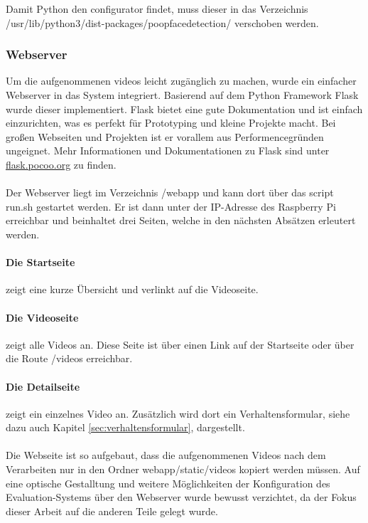 Damit Python den configurator findet, muss dieser in das Verzeichnis /usr/lib/python3/dist-packages/poopfacedetection/ verschoben werden.

\subsubsection{Webserver}
Um die aufgenommenen videos leicht zugänglich zu machen, wurde ein einfacher Webserver in das System integriert. Basierend auf dem Python Framework Flask wurde dieser implementiert. Flask bietet eine gute Dokumentation und ist einfach einzurichten, was es perfekt für Prototyping und kleine Projekte macht. Bei großen Webseiten und Projekten ist er vorallem aus Performencegründen ungeignet. Mehr Informationen und Dokumentationen zu Flask sind unter \href{http://flask.pocoo.org/}{flask.pocoo.org} zu finden. \\
\\
Der Webserver liegt im Verzeichnis /webapp und kann dort über das script run.sh gestartet werden. Er ist dann unter der IP-Adresse des Raspberry Pi erreichbar und beinhaltet drei Seiten, welche in den nächsten Absätzen erleutert werden. 

\paragraph{Die Startseite} zeigt eine kurze Übersicht und verlinkt auf die Videoseite.

\paragraph{Die Videoseite} zeigt alle Videos an. Diese Seite ist über einen Link auf der Startseite oder über die Route /videos erreichbar.

\paragraph{Die Detailseite} zeigt ein einzelnes Video an. Zusätzlich wird dort ein Verhaltensformular, siehe dazu auch Kapitel \ref{sec:verhaltensformular}, dargestellt. \\
\\
Die Webseite ist so aufgebaut, dass die aufgenommenen Videos nach dem Verarbeiten nur in den Ordner webapp/static/videos kopiert werden müssen. Auf eine optische Gestalltung und weitere Möglichkeiten der Konfiguration des Evaluation-Systems über den Webserver wurde bewusst verzichtet, da der Fokus dieser Arbeit auf die anderen Teile gelegt wurde.

